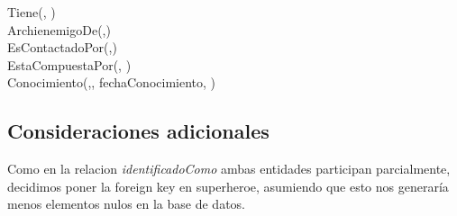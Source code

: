 \documentclass[a4paper,10pt]{article}
\begin{document}
Tiene(, )\\
ArchienemigoDe(,)\\
EsContactadoPor(,)\\
EstaCompuestaPor(, )\\
Conocimiento(,,
fechaConocimiento, )

\subsection{Consideraciones adicionales}\label{consideraciones-adicionales}

Como en la relacion \emph{identificadoComo} ambas entidades participan
parcialmente, decidimos poner la foreign key en superheroe, asumiendo
que esto nos generaría menos elementos nulos en la base de datos.
\end{document}
